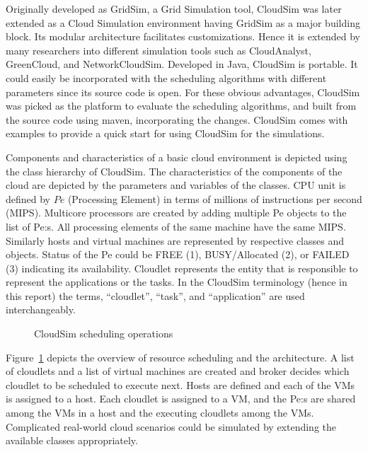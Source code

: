 \documentclass[times, 10pt,twocolumn]{article}
\begin{document}
Originally developed as GridSim, a Grid Simulation tool, CloudSim was later extended as a Cloud Simulation environment having GridSim as a major building block\cite{cloudgridsim}. Its modular architecture facilitates customizations. Hence it is extended by many researchers into different simulation tools such as CloudAnalyst\cite{cloudanalyst}, GreenCloud\cite{greencloud}, and NetworkCloudSim\cite{ncloudsim}. Developed in Java, CloudSim is portable. It could easily be incorporated with the scheduling algorithms with different parameters since its source code is open. For these obvious advantages, CloudSim was picked as the platform to evaluate the scheduling algorithms, and built from the source code using maven, incorporating the changes. CloudSim comes with examples to provide a quick start for using CloudSim for the simulations.

Components and characteristics of a basic cloud environment is depicted using the class hierarchy of CloudSim. The characteristics of the components of the cloud are depicted by the parameters and variables of the classes. CPU unit is defined by $Pe$ (Processing Element) in terms of millions of instructions per second (MIPS). Multicore processors are created by adding multiple Pe objects to the list of Pe:s. All processing elements of the same machine have the same MIPS. Similarly hosts and virtual machines are represented by respective classes and objects. Status of the Pe could be FREE (1), BUSY/Allocated (2), or FAILED (3) indicating its availability. Cloudlet represents the entity that is responsible to represent the applications or the tasks. In the CloudSim terminology (hence in this report) the terms, ``cloudlet'', ``task'', and ``application'' are used interchangeably. 
\begin{figure}[ht]
 \caption{CloudSim scheduling operations}
 \label{fig:scheduling}
\end{figure}
Figure~\ref{fig:scheduling} depicts the overview of resource scheduling and the architecture. A list of cloudlets and a list of virtual machines are created and broker decides which cloudlet to be scheduled to execute next. Hosts are defined and each of the VMs is assigned to a host. Each cloudlet is assigned to a VM, and the Pe:s are shared among the VMs in a host and the executing cloudlets among the VMs. Complicated real-world cloud scenarios could be simulated by extending the available classes appropriately.
\end{document}
